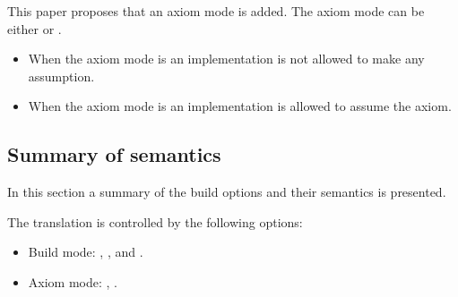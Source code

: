 This paper proposes that an axiom mode is added. The axiom mode can be either
 or .

\begin{itemize}
  \item When the axiom mode is  an implementation is not
        allowed to make any assumption.
  \item When the axiom mode is  an implementation is
        allowed to assume the axiom.
\end{itemize}

\subsection{Summary of semantics}

In this section a summary of the build options and their semantics is presented.

The translation is controlled by the following options:

\begin{itemize}
  \item Build mode: , , and .
  \item Axiom mode: , .
\end{itemize}

